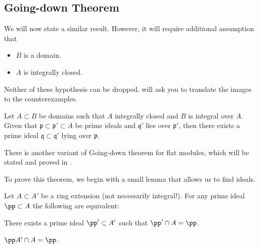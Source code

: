 
\subsection{Going-down Theorem}
We will now state a similar result.
However, it will require additional assumption that
\begin{itemize}
    \item $B$ is a domain.
    \item $A$ is integrally closed.
\end{itemize}
\begin{remark}
Neither of these hypothesis can be dropped.
 will ask you to translate the 
images to the counterexamples.
\end{remark}
\begin{theorem}
    \label{thm:going_down}
    Let $A\subset B$ be domains such that $A$ integrally closed
    and $B$ is integral over $A$.
    Given that $\mathfrak p\subset\mathfrak p'\subset A$
    be prime ideals and $\mathfrak q'$ lies over $\mathfrak p'$,
    then there exists a prime ideal $\mathfrak q\subset\mathfrak q'$
    lying over $\mathfrak p$.
    \begin{center}
    \end{center}
\end{theorem}
\begin{remark}
There is another variant of Going-down theorem
for flat modules, which will be stated and proved in 
.
\end{remark}
To prove this theorem, we begin with a small lemma that allows us to find ideals.
\begin{lemma}
    \label{lem:lying_over_criterion}
   Let $A\subset A'$ be a ring extension
   (not necessarily integral!).
   For any prime ideal $\pp\subset A$ the following are equivalent:
   \begin{alphenum}
       \item There exists a prime ideal $\pp'\subset A'$ such that $\pp'\cap A=\pp$.
       \item $\pp A' \cap A = \pp$.
   \end{alphenum}
\end{lemma}

